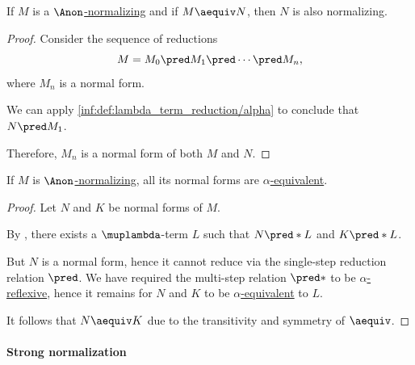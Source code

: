 \begin{proposition}\label{thm:normalization_of_alpha_equivalent_term}
  If \( M \) is a \hyperref[def:lambda_term_normal_form]{\( \Anon \)-normalizing} and if \( M \aequiv N \), then \( N \) is also normalizing.
\end{proposition}
\begin{proof}
  Consider the sequence of reductions
  \begin{equation*}
    M = M_0 \pred M_1 \pred \cdots \pred M_n,
  \end{equation*}
  where \( M_n \) is a normal form.

  We can apply \ref{inf:def:lambda_term_reduction/alpha} to conclude that \( N \pred M_1 \).

  Therefore, \( M_n \) is a normal form of both \( M \) and \( N \).
\end{proof}

\begin{proposition}\label{thm:lambda_term_normal_form_uniqueness}
  If \( M \) is \hyperref[def:lambda_term_normal_form]{\( \Anon \)-normalizing}, all its normal forms are \hyperref[def:lambda_term_alpha_equivalence]{\( \alpha \)-equivalent}.
\end{proposition}
\begin{proof}
  Let \( N \) and \( K \) be normal forms of \( M \).

  By , there exists a \( \muplambda \)-term \( L \) such that \( N \pred* L \) and \( K \pred* L \).

  But \( N \) is a normal form, hence it cannot reduce via the single-step reduction relation \( {\pred} \). We have required the multi-step relation \( {\pred*} \) to be \hyperref[def:alpha_reflexive]{\( \alpha \)-reflexive}, hence it remains for \( N \) and \( K \) to be \hyperref[def:lambda_term_alpha_equivalence]{\( \alpha \)-equivalent} to \( L \).

  It follows that \( N \aequiv K \) due to the transitivity and symmetry of \( {\aequiv} \).
\end{proof}

\paragraph{Strong normalization}

